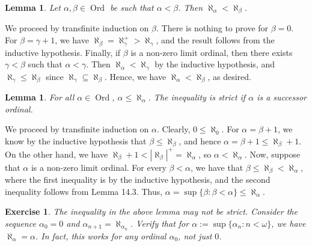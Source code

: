 \documentclass[10pt]{article}
\makeatletter
\DeclareMathOperator{\Ord}{Ord}
\theoremstyle{newstyle}
\newtheorem{lemma}[thm]{Lemma}
\newtheorem{exercise}[thm]{Exercise}
\newenvironment{pf}[1][\proofname]{\par
  \pushQED{\qed}%
  \normalfont \topsep0\p@\relax
  \trivlist
  \item[\hskip\labelsep\scshape
  #1\@addpunct{.}]\ignorespaces
}{%
  \popQED\endtrivlist\@endpefalse
}
\makeatother
\begin{document}
\begin{lemma} 
Let $\alpha, \beta \in \Ord$ be such that $\alpha < \beta$. Then $\aleph_\alpha < \aleph_\beta$. 
\end{lemma}
\begin{pf}
We proceed by transfinite induction on $\beta$. There is nothing to prove for $\beta = 0$. 
For $\beta = \gamma + 1$, we have $\aleph_\beta = \aleph_\gamma^+ > \aleph_\gamma$, and the 
result follows from the inductive hypothesis. Finally, if $\beta$ is a non-zero limit ordinal, 
then there exists $\gamma < \beta$ such that $\alpha < \gamma$. Then $\aleph_\alpha 
< \aleph_\gamma$ by the inductive hypothesis, and $\aleph_\gamma \leq \aleph_\beta$ since 
$\aleph_\gamma \subseteq \aleph_\beta$. Hence, we have $\aleph_\alpha < \aleph_\beta$, as desired.
\end{pf}

\begin{lemma}
For all $\alpha \in \Ord$, $\alpha \leq \aleph_\alpha$. The inequality is strict if 
$\alpha$ is a successor ordinal.
\end{lemma}
\begin{pf}
We proceed by transfinite induction on $\alpha$. Clearly, $0 \leq \aleph_0$. For 
$\alpha = \beta + 1$, we know by the inductive hypothesis that $\beta \leq \aleph_\beta$, 
and hence $\alpha = \beta + 1 \leq \aleph_\beta + 1$. On the other hand, we have 
$\aleph_\beta + 1 < |\aleph_\beta|^+ = \aleph_\alpha$, so $\alpha < \aleph_\alpha$. 
Now, suppose that $\alpha$ is a non-zero limit ordinal. For every $\beta < \alpha$, we have that 
$\beta \leq \aleph_\beta < \aleph_\alpha$, where the first inequality is by the inductive hypothesis, 
and the second inequality follows from Lemma 14.3. Thus, $\alpha = 
\sup\{\beta : \beta < \alpha\} \leq \aleph_\alpha$. 
\end{pf}

\begin{exercise}
The inequality in the above lemma may not be strict. Consider the sequence 
$\alpha_0 = 0$ and $\alpha_{n+1} = \aleph_{\alpha_n}$. Verify that 
for $\alpha := \sup\{\alpha_n : n < \omega\}$, we have $\aleph_\alpha = \alpha$. 
In fact, this works for any ordinal $\alpha_0$, not just $0$.
\end{exercise}
\end{document}
